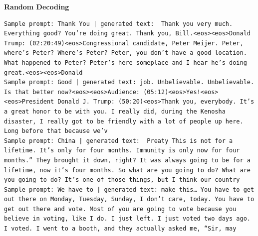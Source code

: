 \documentclass{article}
\begin{document}
\textbf{Random Decoding}
\begin{lstlisting}
Sample prompt: Thank You | generated text:  Thank you very much. Everything good? You’re doing great. Thank you, Bill.<eos><eos>Donald Trump: (02:20:49)<eos>Congressional candidate, Peter Meijer. Peter, where’s Peter? Where’s Peter? Peter, you don’t have a good location. What happened to Peter? Peter’s here someplace and I hear he’s doing great.<eos><eos>Donald
Sample prompt: Good | generated text: job. Unbelievable. Unbelievable. Is that better now?<eos><eos>Audience: (05:12)<eos>Yes!<eos><eos>President Donald J. Trump: (50:20)<eos>Thank you, everybody. It’s a great honor to be with you. I really did, during the Kenosha disaster, I really got to be friendly with a lot of people up here. Long before that because we’v
Sample prompt: China | generated text:  Preaty This is not for a lifetime. It’s only for four months. Immunity is only now for four months.” They brought it down, right? It was always going to be for a lifetime, now it’s four months. So what are you going to do? What are you going to do? It’s one of those things, but I think our country 
Sample prompt: We have to | generated text: make this… You have to get out there on Monday, Tuesday, Sunday, I don’t care, today. You have to get out there and vote. Most of you are going to vote because you believe in voting, like I do. I just left. I just voted two days ago. I voted. I went to a booth, and they actually asked me, “Sir, may 


\end{lstlisting}
\end{document}
